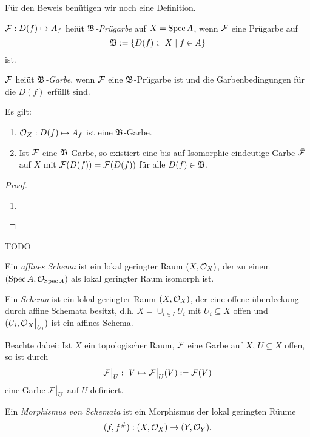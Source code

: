 Für den Beweis benütigen wir noch eine Definition.

\begin{definition}
	$\mathcal{F}:D(f) \mapsto A_f$ heiüt \emph{$\mathfrak B$-Prügarbe} auf
	$X = \operatorname{Spec} A$, wenn 
	$\mathcal{F}$ eine Prügarbe auf 
	\[
		\mathfrak B := \{D(f) \subset X \mid f \in A\}
	\]
	ist.
	
	$\mathcal{F}$ heiüt \emph{$\mathfrak B$-Garbe}, wenn $\mathcal{F}$ eine $\mathfrak B$-Prügarbe ist
	und die Garbenbedingungen für die $D(f)$ erfüllt sind.
\end{definition}

\begin{hilfslemma}
	\label{hilfslemma:1}
	Es gilt:
	\begin{enumerate}
	  \item $\mathcal{O}_X: D(f) \mapsto A_f$ ist eine $\mathfrak B$-Garbe.
	  \item Ist $\mathcal{F}$ eine $\mathfrak B$-Garbe, so existiert eine bis auf
	  	Isomorphie eindeutige Garbe $\bar {\mathcal{F}}$ auf $X$ mit
	  	$\bar{\mathcal{F}}(D(f)) = \mathcal{F}(D(f))$ für alle $D(f) \in \mathfrak B$.
	\end{enumerate}
\end{hilfslemma}
\begin{proof}
	\begin{enumerate}
	  \item 
	\end{enumerate}
\end{proof}


 TODO
 
 
\begin{definition}
	Ein \emph{affines Schema} ist ein lokal geringter Raum
	$(X,\mathcal{O}_X)$, der zu einem $(\operatorname{Spec} A, \mathcal{O}_{\operatorname{Spec} A})$ als lokal geringter
	Raum isomorph ist.
	
	Ein \emph{Schema} ist ein lokal geringter Raum $(X,\mathcal{O}_X)$, der eine
	offene überdeckung durch affine Schemata besitzt, d.h.
	$X = \cup_{i\in I} U_i$ mit $U_i \subseteq X$ offen und 
	$(U_i, \mathcal{O}_X\big|_{U_i})$ ist ein affines Schema.
\end{definition}

\begin{bemerkung}
	Beachte dabei: Ist $X$ ein topologischer Raum, $\mathcal{F}$ eine Garbe auf $X$,
	$U\subseteq X$ offen, so ist durch
	\[
		\mathcal{F}\big|_{U}:\ V \mapsto \mathcal{F}\big|_{U} (V) := \mathcal{F}(V)
	\]
	eine Garbe $\mathcal{F}\big|_{U}$ auf $U$ definiert.
\end{bemerkung}

\begin{definition}
	Ein \emph{Morphismus von Schemata} ist ein
	Morphismus der lokal geringten Rüume
	\[
		(f,f^{\#}): (X, \mathcal{O}_X)  \to  (Y, \mathcal{O}_Y).
	\]
\end{definition}

